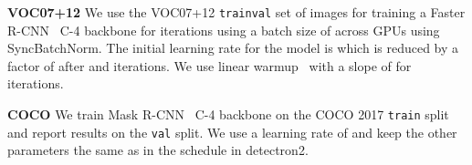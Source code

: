 \documentclass{article}
\begin{document}
\par \noindent \textbf{VOC07+12} We use the VOC07+12 \texttt{trainval} set of  images for training a Faster R-CNN~\cite{ren2015faster} C-4 backbone for  iterations using a batch size of  across  GPUs using SyncBatchNorm. The initial learning rate for the model is  which is reduced by a factor of  after  and  iterations. We use linear warmup~\cite{goyal2017accurate} with a slope of  for  iterations.
\par \noindent \textbf{COCO} We train Mask R-CNN~\cite{he2017mask} C-4 backbone on the COCO 2017 \texttt{train} split and report results on the \texttt{val} split. We use a learning rate of  and keep the other parameters the same as in the  schedule in detectron2.



 
\end{document}
